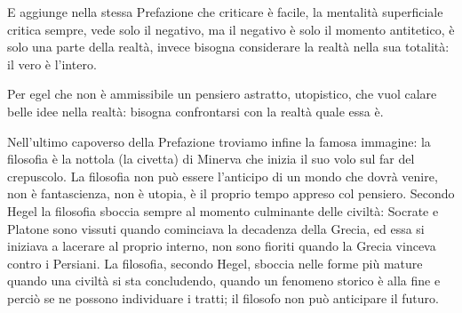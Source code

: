 \documentclass[a4paper,12pt,oneside,openany]{book}%
\begin{document}
E aggiunge nella stessa Prefazione che criticare è facile, la mentalità superficiale critica sempre, vede solo il negativo, ma il negativo è solo il momento antitetico, è solo una parte della realtà, invece bisogna considerare la realtà nella sua totalità: il vero è l’intero.

Per egel che non è ammissibile un pensiero astratto, utopistico, che vuol calare belle idee nella realtà: bisogna confrontarsi con la realtà quale essa è.
	
Nell’ultimo capoverso della Prefazione troviamo infine la famosa immagine: la filosofia è la nottola (la civetta) di Minerva che inizia il suo volo sul far del crepuscolo. La filosofia non può essere l’anticipo di un mondo che dovrà venire, non è fantascienza, non è utopia, è il proprio tempo appreso col pensiero. Secondo Hegel la filosofia sboccia sempre al momento culminante delle civiltà: Socrate e Platone sono vissuti quando cominciava la decadenza della Grecia, ed essa si iniziava a lacerare al proprio interno, non sono fioriti quando la Grecia vinceva contro i Persiani. La filosofia, secondo Hegel, sboccia nelle forme più mature quando una civiltà si sta concludendo, quando un fenomeno storico è alla fine e perciò se ne possono individuare i tratti; il filosofo non può anticipare il futuro.




	
\end{document}
